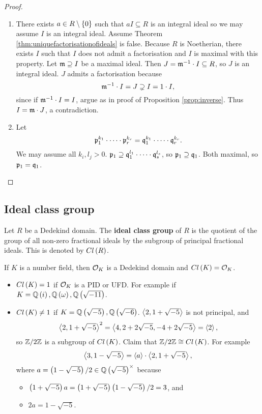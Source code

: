 \begin{proof}
\hfill
\begin{enumerate}
\item There exists $ a \in R \setminus \left\{ 0 \right\} $ such that $ aI \subseteq R $ is an integral ideal so we may assume $ I $ is an integral ideal. Assume Theorem \ref{thm:uniquefactorisationofideals} is false. Because $ R $ is Noetherian, there exists $ I $ such that $ I $ does not admit a factorisation and $ I $ is maximal with this property. Let $ \mathfrak{m} \supseteq I $ be a maximal ideal. Then $ J = \mathfrak{m}^{-1} \cdot I \subseteq R $, so $ J $ is an integral ideal. $ J $ admits a factorisation because
$$ \mathfrak{m}^{-1} \cdot I = J \supsetneq I = 1 \cdot I, $$
since if $ \mathfrak{m}^{-1} \cdot I = I $, argue as in proof of Proposition \ref{prop:inverse}. Thus $ I = \mathfrak{m} \cdot J $, a contradiction.
\item Let
$$ \mathfrak{p}_1^{k_1} \cdot \dots \cdot \mathfrak{p}_r^{k_r} = \mathfrak{q}_1^{k_1} \cdot \dots \cdot \mathfrak{q}_r^{k_r}. $$
We may assume all $ k_i, l_j > 0 $. $ \mathfrak{p}_1 \supseteq \mathfrak{q}_1^{l_1} \cdot \dots \cdot \mathfrak{q}_s^{l_s} $, so $ \mathfrak{p}_1 \supseteq \mathfrak{q}_1 $. Both maximal, so $ \mathfrak{p}_1 = \mathfrak{q}_1 $.
\end{enumerate}
\end{proof}


\subsection{Ideal class group}

\begin{definition}
Let $ R $ be a Dedekind domain. The \textbf{ideal class group} of $ R $ is the quotient of the group of all non-zero fractional ideals by the subgroup of principal fractional ideals. This is denoted by $ Cl\left( R \right) $.
\end{definition}

If $ K $ is a number field, then $ \mathcal{O}_K $ is a Dedekind domain and $ Cl\left( K \right) = \mathcal{O}_K $.

\begin{example*}
\hfill
\begin{itemize}
\item $ Cl\left( K \right) = 1 $ if $ \mathcal{O}_K $ is a PID or UFD. For example if $ K = \mathbb{Q}\left( i \right), \mathbb{Q}\left( \omega \right), \mathbb{Q}\left( \sqrt{-11} \right) $.
\item $ Cl\left( K \right) \ne 1 $ if $ K = \mathbb{Q}\left( \sqrt{-5} \right), \mathbb{Q}\left( \sqrt{-6} \right) $. $ \left\langle 2, 1 + \sqrt{-5} \right\rangle $ is not principal, and
$$ \left\langle 2, 1 + \sqrt{-5} \right\rangle^2 = \left\langle 4, 2 + 2\sqrt{-5}, -4 + 2\sqrt{-5} \right\rangle = \left\langle 2 \right\rangle, $$
so $ \mathbb{Z} / 2\mathbb{Z} $ is a subgroup of $ Cl\left( K \right) $. Claim that $ \mathbb{Z} / 2\mathbb{Z} \cong Cl\left( K \right) $. For example
$$ \left\langle 3, 1 - \sqrt{-5} \right\rangle = \left\langle a \right\rangle \cdot \left\langle 2, 1 + \sqrt{-5} \right\rangle, $$
where $ a = \left( 1 - \sqrt{-5} \right) / 2 \in \mathbb{Q}\left( \sqrt{-5} \right)^\times $ because
\begin{itemize}
\item $ \left( 1 + \sqrt{-5} \right)a = \left( 1 + \sqrt{-5} \right)\left( 1 - \sqrt{-5} \right) / 2 = 3 $, and
\item $ 2a = 1 - \sqrt{-5} $.
\end{itemize}
\end{itemize}
\end{example*}

